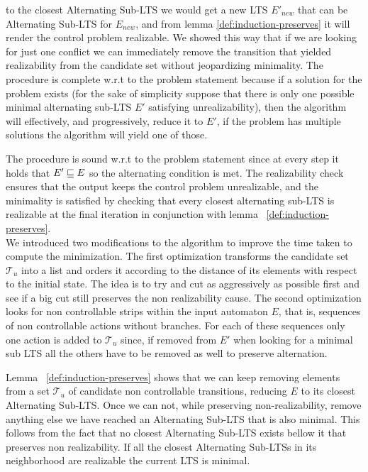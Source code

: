 to the closest Alternating Sub-LTS we would get a new LTS
$E'_{new}$ that can be Alternating Sub-LTS for $E_{new}$, and from lemma
\ref{def:induction-preserves} it will render the control problem
realizable.  We showed this way that if we are looking for just one
conflict we can immediately remove the transition that yielded realizability 
from the candidate set without jeopardizing minimality.
%
The procedure is complete w.r.t to the problem statement because
if a solution for the problem exists (for the sake of simplicity
suppose that there is only one possible minimal alternating sub-LTS $E'$
satisfying unrealizability), then the algorithm will effectively, and progressively,
reduce it to $E'$, if the problem has multiple solutions the
algorithm will yield one of those.

The procedure is sound w.r.t to the problem statement since 
at every step it holds that $E' \sqsubseteq E$ so the alternating condition
is met.  The realizability check ensures that the output keeps the
control problem unrealizable, and the minimality is satisfied by
checking that every closest alternating sub-LTS is realizable at the
final iteration in conjunction with lemma  ~\ref{def:induction-preserves}.\\

We introduced two modifications to the algorithm
to improve the time taken to compute the minimization.
The first optimization transforms the candidate set $\mathcal{T}_u$
into a list and orders it according to the distance of its elements 
with respect to the initial state.  The idea is to try and cut
as aggressively as possible first and see if a big cut still
preserves the non realizability cause.  The second optimization
looks for non controllable strips within the  input automaton
$E$, that is, sequences of non controllable actions without branches.
For each of these sequences only one action is
added to $\mathcal{T}_u$ since, if removed from $E'$
when looking for a minimal sub LTS all the others have to be removed
as well to preserve alternation.

Lemma ~\ref{def:induction-preserves} shows that we can keep removing
elements from a set $\mathcal{T}_u$ of candidate non controllable
transitions, reducing $E$ to its closest Alternating Sub-LTS.
Once we can not,
while preserving non-realizability, remove
anything else we have reached an Alternating Sub-LTS that is also minimal.
This follows from the fact that
no closest Alternating Sub-LTS exists bellow it that preserves non realizability.
If all the closest Alternating Sub-LTSs in its neighborhood 
are realizable the current LTS is minimal.


